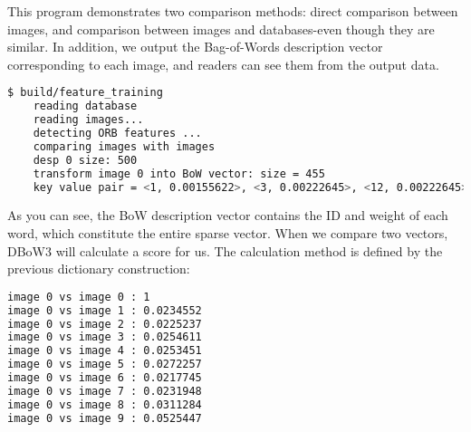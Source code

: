 This program demonstrates two comparison methods: direct comparison between images, and comparison between images and databases-even though they are similar. In addition, we output the Bag-of-Words description vector corresponding to each image, and readers can see them from the output data.

\begin{lstlisting}[language=sh,caption=Terminal output:]
	$ build/feature_training
	reading database
	reading images... 
	detecting ORB features ... 
	comparing images with images 
	desp 0 size: 500
	transform image 0 into BoW vector: size = 455
	key value pair = <1, 0.00155622>, <3, 0.00222645>, <12, 0.00222645>, <13, 0.00222645>, <14, 0.00222645>, <22, 0.00222645>, <33, 0.00222645>, <37, 0.00155622>, <38, 0.00222645>, <39, 0.00222645>, <43, 0.00222645>, <57, 0.00155622> ......
\end{lstlisting}

As you can see, the BoW description vector contains the ID and weight of each word, which constitute the entire sparse vector. When we compare two vectors, DBoW3 will calculate a score for us. The calculation method is defined by the previous dictionary construction:

\begin{lstlisting}[language=sh,caption=Terminal output:]
image 0 vs image 0 : 1
image 0 vs image 1 : 0.0234552
image 0 vs image 2 : 0.0225237
image 0 vs image 3 : 0.0254611
image 0 vs image 4 : 0.0253451
image 0 vs image 5 : 0.0272257
image 0 vs image 6 : 0.0217745
image 0 vs image 7 : 0.0231948
image 0 vs image 8 : 0.0311284
image 0 vs image 9 : 0.0525447
\end{lstlisting}

